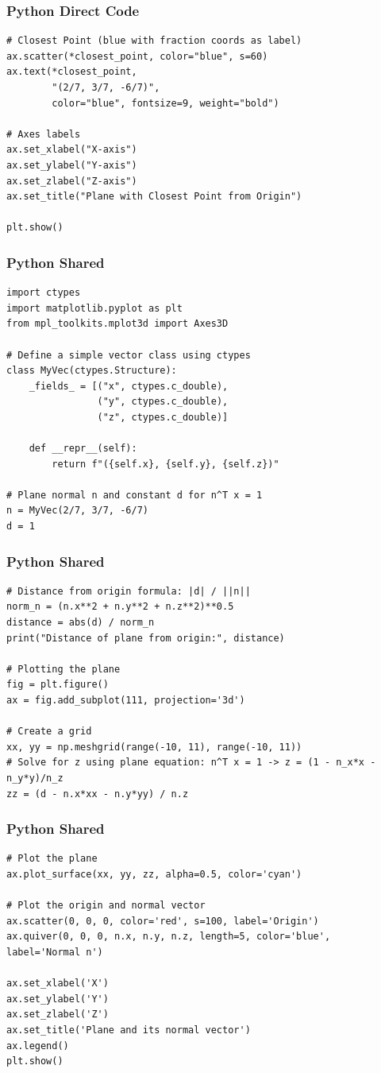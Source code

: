 \documentclass{beamer}
\begin{document}
\begin{frame}[fragile]
       \frametitle{Python Direct Code}
       \begin{lstlisting}
# Closest Point (blue with fraction coords as label)
ax.scatter(*closest_point, color="blue", s=60)
ax.text(*closest_point,
        "(2/7, 3/7, -6/7)",
        color="blue", fontsize=9, weight="bold")

# Axes labels
ax.set_xlabel("X-axis")
ax.set_ylabel("Y-axis")
ax.set_zlabel("Z-axis")
ax.set_title("Plane with Closest Point from Origin")

plt.show()
\end{lstlisting}
\end{frame}
\begin{frame}[fragile]
       \frametitle{Python Shared}
       \begin{lstlisting}
import ctypes
import matplotlib.pyplot as plt
from mpl_toolkits.mplot3d import Axes3D

# Define a simple vector class using ctypes
class MyVec(ctypes.Structure):
    _fields_ = [("x", ctypes.c_double),
                ("y", ctypes.c_double),
                ("z", ctypes.c_double)]
    
    def __repr__(self):
        return f"({self.x}, {self.y}, {self.z})"

# Plane normal n and constant d for n^T x = 1
n = MyVec(2/7, 3/7, -6/7)
d = 1
\end{lstlisting}
\end{frame}
\begin{frame}[fragile]
       \frametitle{Python Shared}
       \begin{lstlisting}
# Distance from origin formula: |d| / ||n||
norm_n = (n.x**2 + n.y**2 + n.z**2)**0.5
distance = abs(d) / norm_n
print("Distance of plane from origin:", distance)

# Plotting the plane
fig = plt.figure()
ax = fig.add_subplot(111, projection='3d')

# Create a grid
xx, yy = np.meshgrid(range(-10, 11), range(-10, 11))
# Solve for z using plane equation: n^T x = 1 -> z = (1 - n_x*x - n_y*y)/n_z
zz = (d - n.x*xx - n.y*yy) / n.z
\end{lstlisting}
\end{frame}
\begin{frame}[fragile]
       \frametitle{Python Shared}
       \begin{lstlisting}
# Plot the plane
ax.plot_surface(xx, yy, zz, alpha=0.5, color='cyan')

# Plot the origin and normal vector
ax.scatter(0, 0, 0, color='red', s=100, label='Origin')
ax.quiver(0, 0, 0, n.x, n.y, n.z, length=5, color='blue', label='Normal n')

ax.set_xlabel('X')
ax.set_ylabel('Y')
ax.set_zlabel('Z')
ax.set_title('Plane and its normal vector')
ax.legend()
plt.show()
\end{lstlisting}
\end{frame}
\end{document}
